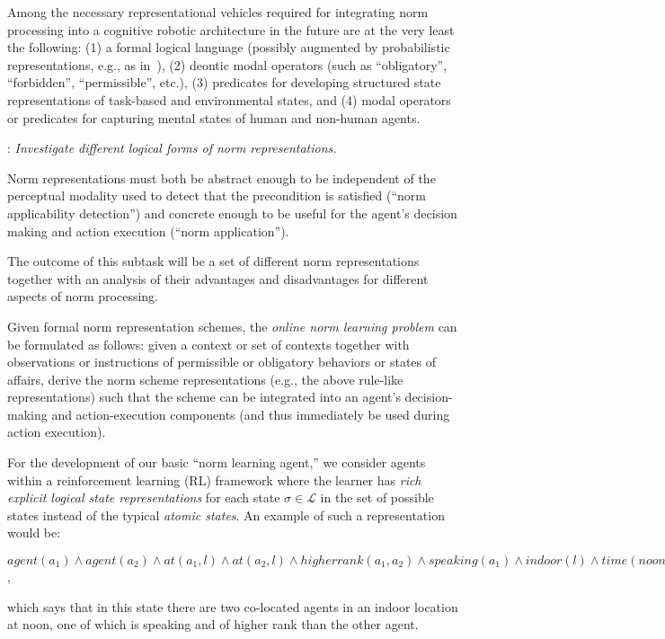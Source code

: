 \documentclass[12pt]{article}
\begin{document}
\noindent Among the necessary representational vehicles required for
integrating norm processing into a cognitive robotic architecture in
the future are at the very least the following: (1) a formal logical
language (possibly augmented by probabilistic representations, e.g.,
as in~\citep{nunzeetal13}), (2) deontic modal operators (such as
``obligatory'', ``forbidden'', ``permissible'', etc.), (3) predicates
for developing structured state representations of task-based and
environmental states, and (4) modal operators or predicates for
capturing mental states of human and non-human agents.

\vskip 0.05in
: {\em Investigate different logical forms of norm
  representations.} 
  \vskip 0.05in
  
\noindent  Norm representations must both be abstract enough to be independent of
  the perceptual modality used to detect that the
  precondition is satisfied (``norm applicability detection'') and
  concrete enough to be useful for the agent's decision making and
  action execution (``norm application'').  
  
 The outcome of this
  subtask will be a set of different norm representations together
  with an analysis of their advantages and disadvantages for different
  aspects of norm processing.  

Given formal norm representation schemes, the {\em online norm
  learning problem} can be formulated as follows: given a context or
set of contexts together with observations or instructions of
permissible or obligatory behaviors or states of affairs, derive the
norm scheme representations (e.g., the above rule-like
representations) such that the scheme can be integrated into an
agent's decision-making and action-execution components (and thus
immediately be used during action execution).

For the development of our basic ``norm learning agent,'' we consider
agents within a reinforcement learning (RL) framework where the
learner has {\em rich explicit logical state representations} for each
state $\sigma \in \mathcal{L}$ in the set of possible states instead
of the typical {\em atomic states}.  An example of such a
representation would be:

\vskip 0.1in
\noindent $agent(a_1) \land agent(a_2) \land at(a_1,l) \land at(a_2,l) \land
higherrank(a_1,a_2) \land speaking(a_1) \land indoor(l) \land
time(noon)$,
\vskip 0.1in

\noindent which says that in this state there are two co-located
agents in an indoor location at noon, one of which is speaking and of
higher rank than the other agent.
\end{document}
